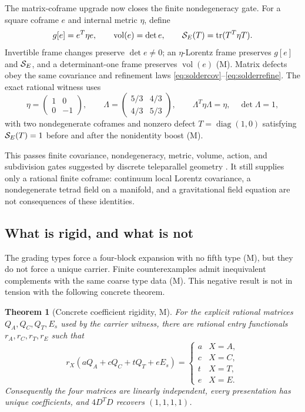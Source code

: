 \documentclass[11pt]{article}
\newcommand{\Mtag}{\textcolor{verified}{\textsc{M}}}
\newcommand{\tr}{\operatorname{tr}}
\newtheorem{theorem}{Theorem}[section]
\begin{document}
The matrix-coframe upgrade now closes the finite nondegeneracy gate.  For a
square coframe $e$ and internal metric $\eta$, define
\begin{equation}\label{eq:inducedmetric}
  g[e]=e^T\eta e,\qquad \operatorname{vol}(e)=\det e,
  \qquad {\cal S}_E(T)=\tr(T^T\eta T).
\end{equation}
Invertible frame changes preserve $\det e\ne0$; an $\eta$-Lorentz frame
preserves $g[e]$ and ${\cal S}_E$, and a determinant-one frame preserves
$\operatorname{vol}(e)$ (\Mtag).  Matrix defects obey the same covariance and
refinement laws \eqref{eq:soldercov}--\eqref{eq:solderrefine}.  The exact
rational witness uses
\begin{equation}\label{eq:rationalboost}
 \eta=\begin{pmatrix}1&0\\0&-1\end{pmatrix},\qquad
 \Lambda=\begin{pmatrix}5/3&4/3\\4/3&5/3\end{pmatrix},
 \qquad \Lambda^T\eta\Lambda=\eta,\quad\det\Lambda=1,
\end{equation}
with two nondegenerate coframes and nonzero defect
$T=\operatorname{diag}(1,0)$ satisfying ${\cal S}_E(T)=1$ before and after the
nonidentity boost (\Mtag).

This passes finite covariance, nondegeneracy, metric, volume, action, and
subdivision gates suggested by discrete teleparallel geometry
\cite{BaezWise}.  It still supplies only a rational finite coframe: continuum
local Lorentz covariance, a nondegenerate tetrad field on a manifold, and a
gravitational field equation are not consequences of these identities.

\subsection{What is rigid, and what is not}

The grading types force a four-block expansion with no fifth type (\Mtag), but
they do not force a unique carrier.  Finite counterexamples admit inequivalent
complements with the same coarse type data (\Mtag).  This negative result is not
in tension with the following concrete theorem.

\begin{theorem}[Concrete coefficient rigidity, \Mtag]\label{thm:rigid}
For the explicit rational matrices $Q_A,Q_C,Q_T,E_s$ used by the carrier
witness, there are rational entry functionals $r_A,r_C,r_T,r_E$ such that
\[
 r_X(aQ_A+cQ_C+tQ_T+eE_s)=
 \begin{cases}a&X=A,\\c&X=C,\\t&X=T,\\e&X=E.\end{cases}
\]
Consequently the four matrices are linearly independent, every presentation
has unique coefficients, and $4D^TD$ recovers $(1,1,1,1)$.
\end{theorem}
\end{document}
